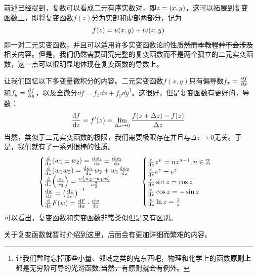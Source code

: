 \documentclass[12pt,a4paper,openany,twoside]{book}
\numberwithin{equation}{section}
\newcommand{\ud}{\mathrm{d}}
\begin{document}
          前述已经提到，复数可以看成二元有序实数对，即$z=\qty(x,y)$，这可以拓展到复变函数上，即将复变函数$f(z)$分为实部和虚部两部分，记为
          \begin{equation}
            f\qty(z)=u\qty(x,y)+iv\qty(x,y)
          \end{equation}
          即一对二元实变函数，并且可以适用许多实变函数论的性质\sout{然而本教程并不会涉及相关内容}。但是，我们仍然需要研究完整的复变函数而不是两个孤立的二元实变函数，这一点可以很明显地体现在复变函数的导数上。

          让我们回忆以下多变量微积分的内容。二元实变函数$f(x,y)$只有偏导数$f_x=\pdv{f}{x}$和$f_y=\pdv{f}{y}$，以及全微分$\dd{f}=f_x\dd{x}+f_y\dd{y}$\footnote{让我们暂时忘掉那些小量、邻域之类的鬼东西吧，物理和化学上的函数\textbf{原则上}都是无穷阶可导的光滑函数\sout{,当然，有原则就会有例外}。}。这很好，但是复变函数有更好的，导数：
          \begin{equation}
            \dv{f}{z}=f'\qty(z)=\lim_{\Delta z\rightarrow0}{\frac{f\qty(z+\Delta z)-f\qty(z)}{\Delta z}}
          \end{equation}
          当然，类似于二元实变函数的极限，我们需要极限存在并且与$\Delta z\rightarrow0$无关。于是，我们就有了一系列很棒的性质。
          \begin{equation*}
            \begin{cases}
              \dv{z}\qty(w_1\pm w_2)=\dv{w_1}{z}\pm\dv{w_2}{z}\\
              \dv{z}\qty(w_1w_2)=\frac{\ud w_1}{\ud z}w_2+w_1\frac{\ud w_2}{\ud z}\\
              \dv{z}\qty(\frac{w_1}{w_2})=\frac{w'_1w_2-w_1w'_2}{w_2^2}\\
              \dv{w}{z}=\qty(\dv{z}{w})^{-1}\\
              \dv{z}F\qty(w)=\dv{F}{w}\cdot\dv{w}{z}
            \end{cases}\ \begin{cases}
              \dv{z}z^n=nz^{n-1},n\in\mathbb{Z}\\
              \dv{z}e^z=e^z\\
              \dv{z}\sin z=\cos z\\
              \dv{z}\cos z=-\sin z\\
              \dv{z}\ln z=\frac{1}{z}
            \end{cases}
          \end{equation*}
          可以看出，复变函数和实变函数非常类似但是又有区别。

          关于复变函数就暂时介绍到这里，后面会有更加详细而繁难的内容。
\end{document}
